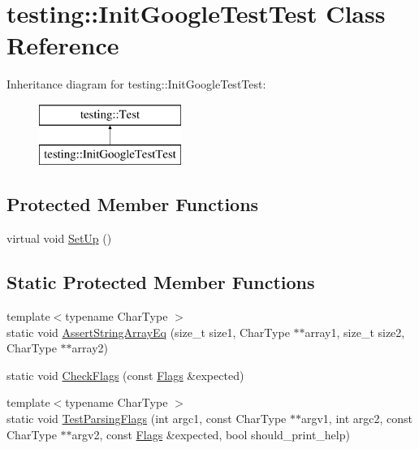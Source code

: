 \hypertarget{classtesting_1_1_init_google_test_test}{}\section{testing\+:\+:Init\+Google\+Test\+Test Class Reference}
\label{classtesting_1_1_init_google_test_test}
Inheritance diagram for testing\+:\+:Init\+Google\+Test\+Test\+:\begin{figure}[H]
\begin{center}
\leavevmode
\includegraphics[height=2.000000cm]{classtesting_1_1_init_google_test_test}
\end{center}
\end{figure}
\subsection*{Protected Member Functions}
\begin{DoxyCompactItemize}
\item 
virtual void \hyperlink{classtesting_1_1_init_google_test_test_a49de9e552ea788c4b79924ec4135ca7a}{Set\+Up} ()
\end{DoxyCompactItemize}
\subsection*{Static Protected Member Functions}
\begin{DoxyCompactItemize}
\item 
{\footnotesize template$<$typename Char\+Type $>$ }\\static void \hyperlink{classtesting_1_1_init_google_test_test_af32acd91b1185c6868072009dce55a7b}{Assert\+String\+Array\+Eq} (size\+\_\+t size1, Char\+Type $\ast$$\ast$array1, size\+\_\+t size2, Char\+Type $\ast$$\ast$array2)
\item 
static void \hyperlink{classtesting_1_1_init_google_test_test_aac37d5d592202bf6614b02fe0b4da9d2}{Check\+Flags} (const \hyperlink{structtesting_1_1_flags}{Flags} \&expected)
\item 
{\footnotesize template$<$typename Char\+Type $>$ }\\static void \hyperlink{classtesting_1_1_init_google_test_test_add290338cf429308d0ab275ae4c46e69}{Test\+Parsing\+Flags} (int argc1, const Char\+Type $\ast$$\ast$argv1, int argc2, const Char\+Type $\ast$$\ast$argv2, const \hyperlink{structtesting_1_1_flags}{Flags} \&expected, bool should\+\_\+print\+\_\+help)
\end{DoxyCompactItemize}
